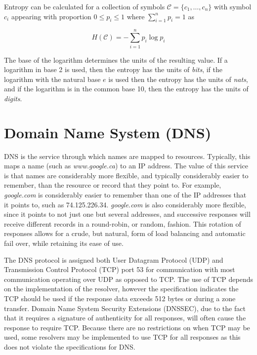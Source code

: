 \documentclass[12pt]{report}
\theoremstyle{remark}
\theoremstyle{definition}
\theoremstyle{definition}
\theoremstyle{definition}
\begin{document}
Entropy can be calculated for a collection of symbols
$\mathcal{C}=\{c_1,\ldots,c_n\}$ with symbol $c_i$ appearing with proportion
$0\leq p_i\leq 1$ where $\sum_{i=1}^n{p_i}=1$ as

 \[H(\mathcal{C})=-\sum_{i=1}^n{p_i \log{p_i}}\]

The base of the logarithm determines the units of the resulting value. If a
logarithm in base 2 is used, then the entropy has the units of \emph{bits}, if
the logarithm with the natural base $e$ is used then the entropy has the units
of \emph{nats}, and if the logarithm is in the common base 10, then the entropy has
the units of \emph{digits}.

\section{Domain Name System (DNS)}

DNS is the service through which names are mapped to
resources\cite{rfc1034}\cite{rfc1035}. Typically, this maps a name (such as
\emph{www.google.ca}) to an IP address. The value of this service is that names
are considerably more flexible, and typically considerably easier to remember,
than the resource or record that they point to. For example, \emph{google.com}
is considerably easier to remember than one of the IP addresses that it points
to, such as 74.125.226.34. \emph{google.com} is also considerably more flexible,
since it points to not just one but several addresses, and successive responses
will receive different records in a round-robin, or random, fashion. This
rotation of responses allows for a crude, but natural, form of load balancing
and automatic fail over, while retaining its ease of use.

The DNS protocol is assigned both User Datagram Protocol (UDP) and Transmission
Control Protocol (TCP) port 53 for communication with most communication
operating over UDP as opposed to TCP. The use of TCP depends on the
implementation of the resolver, however the specification indicates the TCP
should be used if the response data exceeds 512 bytes or during a zone
transfer\cite{rfc1035}. Domain Name System Security Extensions (DNSSEC), due to
the fact that it requires a signature of authenticity for all responses, will
often cause the response to require TCP\cite{rfc4034}. Because there are no
restrictions on when TCP may be used, some resolvers may be implemented to use
TCP for all responses as this does not violate the specifications for DNS.

\end{document}
